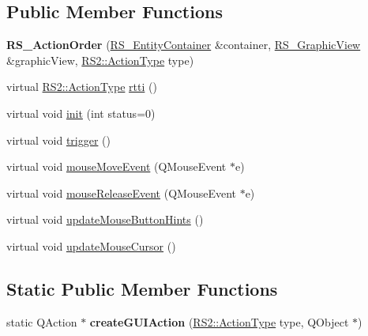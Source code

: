 \subsection*{Public Member Functions}
\begin{DoxyCompactItemize}
\item 
\hypertarget{classRS__ActionOrder_a133dcb0d32e6b32ba7126e9f6c7dccf8}{{\bfseries R\-S\-\_\-\-Action\-Order} (\hyperlink{classRS__EntityContainer}{R\-S\-\_\-\-Entity\-Container} \&container, \hyperlink{classRS__GraphicView}{R\-S\-\_\-\-Graphic\-View} \&graphic\-View, \hyperlink{classRS2_afe3523e0bc41fd637b892321cfc4b9d7}{R\-S2\-::\-Action\-Type} type)}\label{classRS__ActionOrder_a133dcb0d32e6b32ba7126e9f6c7dccf8}

\item 
virtual \hyperlink{classRS2_afe3523e0bc41fd637b892321cfc4b9d7}{R\-S2\-::\-Action\-Type} \hyperlink{classRS__ActionOrder_a43099f5575476caa9a691488dd5c017b}{rtti} ()
\item 
virtual void \hyperlink{classRS__ActionOrder_a2ea08979959565e232b1e0a1a1df17e2}{init} (int status=0)
\item 
virtual void \hyperlink{classRS__ActionOrder_a18859dc9a147c60ff3260af43c5d62c9}{trigger} ()
\item 
virtual void \hyperlink{classRS__ActionOrder_abe388a24f81fd7a79c6acdad760af308}{mouse\-Move\-Event} (Q\-Mouse\-Event $\ast$e)
\item 
virtual void \hyperlink{classRS__ActionOrder_aa14daecc225bbbdf9b7ea3ebac14349a}{mouse\-Release\-Event} (Q\-Mouse\-Event $\ast$e)
\item 
virtual void \hyperlink{classRS__ActionOrder_a909763135e3414bcaacd9b9fbe8d3610}{update\-Mouse\-Button\-Hints} ()
\item 
virtual void \hyperlink{classRS__ActionOrder_afc7d97d2217c5db724f03cb8d44e97f5}{update\-Mouse\-Cursor} ()
\end{DoxyCompactItemize}
\subsection*{Static Public Member Functions}
\begin{DoxyCompactItemize}
\item 
\hypertarget{classRS__ActionOrder_aaa59fa825b1149998ece7f65dc8c04c8}{static Q\-Action $\ast$ {\bfseries create\-G\-U\-I\-Action} (\hyperlink{classRS2_afe3523e0bc41fd637b892321cfc4b9d7}{R\-S2\-::\-Action\-Type} type, Q\-Object $\ast$)}\label{classRS__ActionOrder_aaa59fa825b1149998ece7f65dc8c04c8}

\end{DoxyCompactItemize}
